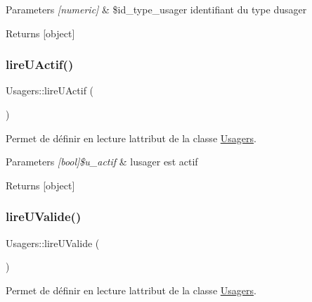 \begin{DoxyParams}{Parameters}
{\em \mbox{[}numeric\mbox{]}} & \$id\+\_\+type\+\_\+usager identifiant du type d\textquotesingle{}usager \\
\hline
\end{DoxyParams}
\begin{DoxyReturn}{Returns}
\mbox{[}object\mbox{]} 
\end{DoxyReturn}
\mbox{\label{class_usagers_a3d31ec0f8b717fbe1d6e559319f9cc92}} 
\subsubsection{\texorpdfstring{lire\+U\+Actif()}{lireUActif()}}
{\footnotesize\ttfamily Usagers\+::lire\+U\+Actif (\begin{DoxyParamCaption}{ }\end{DoxyParamCaption})}



Permet de définir en lecture l\textquotesingle{}attribut de la classe \hyperlink{class_usagers}{Usagers}. 


\begin{DoxyParams}{Parameters}
{\em \mbox{[}bool\mbox{]}\$u\+\_\+actif} & l\textquotesingle{}usager est actif \\
\hline
\end{DoxyParams}
\begin{DoxyReturn}{Returns}
\mbox{[}object\mbox{]} 
\end{DoxyReturn}
\mbox{\label{class_usagers_aaea70589f511b5d23652b6384b336fd2}} 
\subsubsection{\texorpdfstring{lire\+U\+Valide()}{lireUValide()}}
{\footnotesize\ttfamily Usagers\+::lire\+U\+Valide (\begin{DoxyParamCaption}{ }\end{DoxyParamCaption})}



Permet de définir en lecture l\textquotesingle{}attribut de la classe \hyperlink{class_usagers}{Usagers}. 


